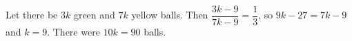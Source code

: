 Let there be $3k$ green and $7k$ yellow balls. Then $\dfrac{3k-9}{7k-9}=\dfrac13$, so $9k-27=7k-9$ and $k=9$. There were $10k=\boxed{90}$ balls.
